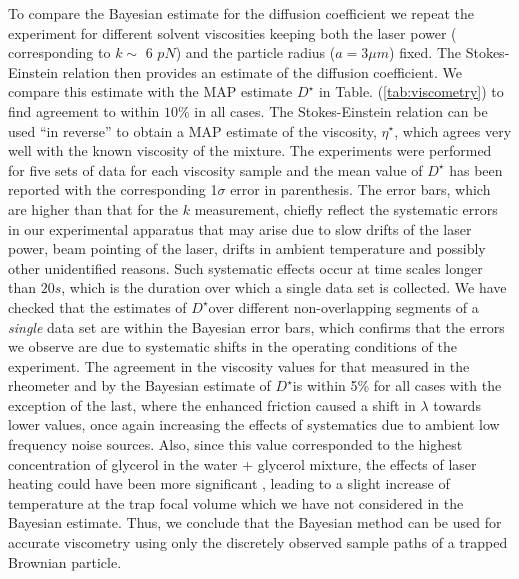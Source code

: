 \documentclass[english,aps, onecolumn, prl,superscriptaddress, notitlepage]{revtex4-1}
\begin{document}
To compare the Bayesian estimate for the diffusion coefficient we
repeat the experiment for different solvent viscosities keeping both
the laser power ( corresponding to $k\sim$ 6 $pN$) and the particle
radius ($a=3\mu m$) fixed. The Stokes-Einstein relation then provides
an estimate of the diffusion coefficient. We compare this estimate
with the MAP estimate $D^{\star}$ in Table. (\ref{tab:viscometry})
to find agreement to within $10\%$ in all cases. The Stokes-Einstein
relation can be used ``in reverse'' to obtain a MAP estimate of
the viscosity, $\eta^{\star}$, which agrees very well with the known
viscosity of the mixture. The experiments were performed for five
sets of data for each viscosity sample and the mean value of $D^{\star}$
has been reported with the corresponding 1$\sigma$ error in parenthesis.
The error bars, which are higher than that for the $k$ measurement,
chiefly reflect the systematic errors in our experimental apparatus
that may arise due to slow drifts of the laser power, beam pointing
of the laser, drifts in ambient temperature and possibly other unidentified
reasons. Such systematic effects occur at time scales longer than
$20s$, which is the duration over which a single data set is collected.
We have checked that the estimates of $D^{\star}$over different non-overlapping
segments of a \emph{single }data set are within the Bayesian error
bars, which confirms that the errors we observe are due to systematic
shifts in the operating conditions of the experiment. The agreement
in the viscosity values for that measured in the rheometer and by
the Bayesian estimate of $D^{\star}$is within 5\% for all cases with
the exception of the last, where the enhanced friction caused a shift
in $\lambda$ towards lower values, once again increasing the effects
of systematics due to ambient low frequency noise sources. Also, since
this value corresponded to the highest concentration of glycerol in
the water + glycerol mixture, the effects of laser heating could have
been more significant \cite{schmidt03heating}, leading to a slight
increase of temperature at the trap focal volume which we have not
considered in the Bayesian estimate. Thus, we conclude that the Bayesian
method can be used for accurate viscometry using only the discretely
observed sample paths of a trapped Brownian particle.
\end{document}
